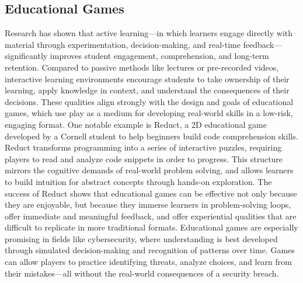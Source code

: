 \documentclass[10pt,twocolumn]{article}
\begin{document}
\subsection{Educational Games}
Research has shown that active learning—in which learners engage directly with material through experimentation, decision-making, and real-time feedback—significantly improves student engagement, comprehension, and long-term retention. Compared to passive methods like lectures or pre-recorded videos, interactive learning environments encourage students to take ownership of their learning, apply knowledge in context, and understand the consequences of their decisions. These qualities align strongly with the design and goals of educational games, which use play as a medium for developing real-world skills in a low-risk, engaging format.
One notable example is Reduct, a 2D educational game developed by a Cornell student to help beginners build code comprehension skills. Reduct transforms programming into a series of interactive puzzles, requiring players to read and analyze code snippets in order to progress. This structure mirrors the cognitive demands of real-world problem solving, and allows learners to build intuition for abstract concepts through hands-on exploration. The success of Reduct shows that educational games can be effective not only because they are enjoyable, but because they immerse learners in problem-solving loops, offer immediate and meaningful feedback, and offer experiential qualities that are difficult to replicate in more traditional formats.
Educational games are especially promising in fields like cybersecurity, where understanding is best developed through simulated decision-making and recognition of patterns over time. Games can allow players to practice identifying threats, analyze choices, and learn from their mistakes—all without the real-world consequences of a security breach. 
\end{document}
